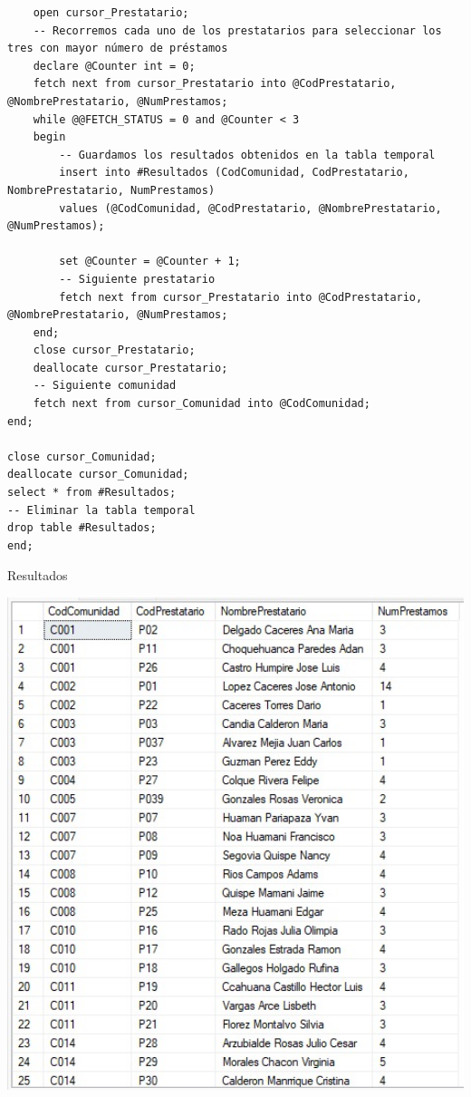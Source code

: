 \documentclass[a4paper]{article}
\begin{document}
\begin{center}
\begin{mycodeboxl}
\begin{lstlisting}
    open cursor_Prestatario;
    -- Recorremos cada uno de los prestatarios para seleccionar los tres con mayor número de préstamos
    declare @Counter int = 0;
    fetch next from cursor_Prestatario into @CodPrestatario, @NombrePrestatario, @NumPrestamos;
    while @@FETCH_STATUS = 0 and @Counter < 3
    begin
        -- Guardamos los resultados obtenidos en la tabla temporal
        insert into #Resultados (CodComunidad, CodPrestatario, NombrePrestatario, NumPrestamos)
        values (@CodComunidad, @CodPrestatario, @NombrePrestatario, @NumPrestamos);

        set @Counter = @Counter + 1;
        -- Siguiente prestatario
        fetch next from cursor_Prestatario into @CodPrestatario, @NombrePrestatario, @NumPrestamos;
    end;
    close cursor_Prestatario;
    deallocate cursor_Prestatario;
    -- Siguiente comunidad
    fetch next from cursor_Comunidad into @CodComunidad;
end;

close cursor_Comunidad;
deallocate cursor_Comunidad;
select * from #Resultados;
-- Eliminar la tabla temporal
drop table #Resultados;
end;

\end{lstlisting}
\end{mycodeboxl}
\end{center}
\newpage
Resultados 
\begin{center}
\includegraphics[width=16cm]{./src/1.jpeg}
\end{center}
\end{document}
